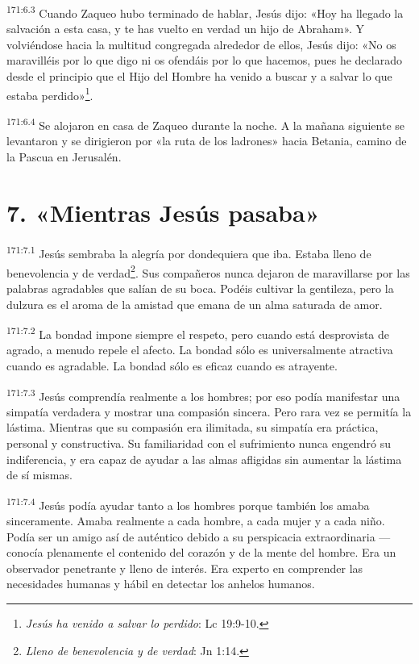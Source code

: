 \par
\textsuperscript{171:6.3} Cuando Zaqueo hubo terminado de hablar, Jesús dijo: «Hoy ha llegado la salvación a esta casa, y te has vuelto en verdad un hijo de Abraham». Y volviéndose hacia la multitud congregada alrededor de ellos, Jesús dijo: «No os maravilléis por lo que digo ni os ofendáis por lo que hacemos, pues he declarado desde el principio que el Hijo del Hombre ha venido a buscar y a salvar lo que estaba perdido»\footnote{\textit{Jesús ha venido a salvar lo perdido}: Lc 19:9-10.}.

\par
\textsuperscript{171:6.4} Se alojaron en casa de Zaqueo durante la noche. A la mañana siguiente se levantaron y se dirigieron por «la ruta de los ladrones» hacia Betania, camino de la Pascua en Jerusalén.

\section*{7. «Mientras Jesús pasaba»}
\par
\textsuperscript{171:7.1} Jesús sembraba la alegría por dondequiera que iba. Estaba lleno de benevolencia y de verdad\footnote{\textit{Lleno de benevolencia y de verdad}: Jn 1:14.}. Sus compañeros nunca dejaron de maravillarse por las palabras agradables que salían de su boca. Podéis cultivar la gentileza, pero la dulzura es el aroma de la amistad que emana de un alma saturada de amor.

\par
\textsuperscript{171:7.2} La bondad impone siempre el respeto, pero cuando está desprovista de agrado, a menudo repele el afecto. La bondad sólo es universalmente atractiva cuando es agradable. La bondad sólo es eficaz cuando es atrayente.

\par
\textsuperscript{171:7.3} Jesús comprendía realmente a los hombres; por eso podía manifestar una simpatía verdadera y mostrar una compasión sincera. Pero rara vez se permitía la lástima. Mientras que su compasión era ilimitada, su simpatía era práctica, personal y constructiva. Su familiaridad con el sufrimiento nunca engendró su indiferencia, y era capaz de ayudar a las almas afligidas sin aumentar la lástima de sí mismas.

\par
\textsuperscript{171:7.4} Jesús podía ayudar tanto a los hombres porque también los amaba sinceramente. Amaba realmente a cada hombre, a cada mujer y a cada niño. Podía ser un amigo así de auténtico debido a su perspicacia extraordinaria ---conocía plenamente el contenido del corazón y de la mente del hombre. Era un observador penetrante y lleno de interés. Era experto en comprender las necesidades humanas y hábil en detectar los anhelos humanos.

